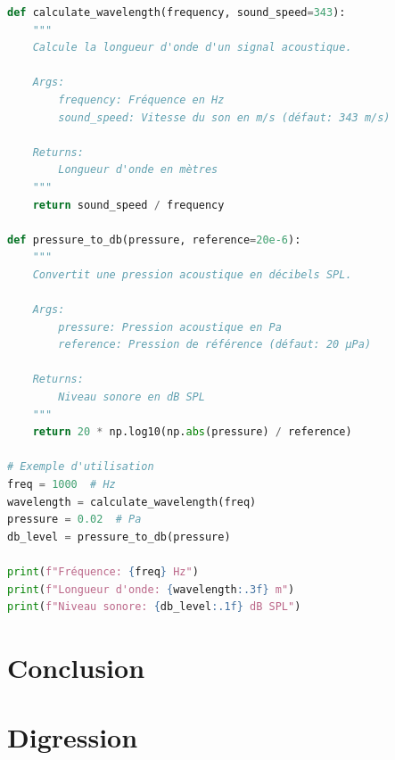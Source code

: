 \begin{lstlisting}[language=Python, caption=Fonctions pour les calculs acoustiques]
def calculate_wavelength(frequency, sound_speed=343):
    """
    Calcule la longueur d'onde d'un signal acoustique.
    
    Args:
        frequency: Fréquence en Hz
        sound_speed: Vitesse du son en m/s (défaut: 343 m/s)
    
    Returns:
        Longueur d'onde en mètres
    """
    return sound_speed / frequency

def pressure_to_db(pressure, reference=20e-6):
    """
    Convertit une pression acoustique en décibels SPL.
    
    Args:
        pressure: Pression acoustique en Pa
        reference: Pression de référence (défaut: 20 µPa)
    
    Returns:
        Niveau sonore en dB SPL
    """
    return 20 * np.log10(np.abs(pressure) / reference)

# Exemple d'utilisation
freq = 1000  # Hz
wavelength = calculate_wavelength(freq)
pressure = 0.02  # Pa
db_level = pressure_to_db(pressure)

print(f"Fréquence: {freq} Hz")
print(f"Longueur d'onde: {wavelength:.3f} m")
print(f"Niveau sonore: {db_level:.1f} dB SPL")
\end{lstlisting}


\section*{Conclusion}

\section*{Digression}
